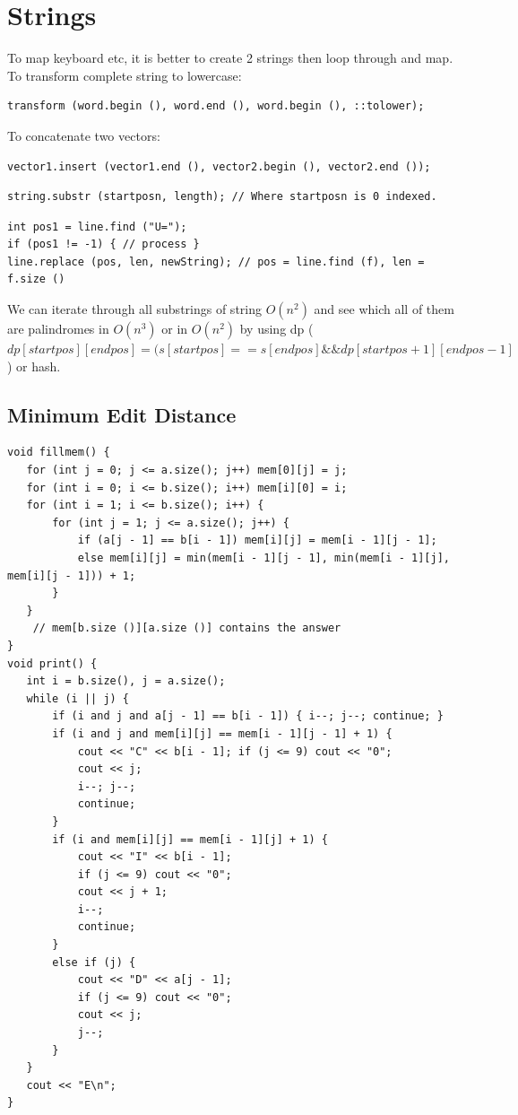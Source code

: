 \documentclass[8pt, a4paper, oneside, twocolumn]{extarticle}
\begin{document}
\section{Strings}
To map keyboard etc, it is better to create 2 strings then loop through and map.\\
To transform complete string to lowercase: 
\begin{verbatim} 
transform (word.begin (), word.end (), word.begin (), ::tolower); 
\end{verbatim}
To concatenate two vectors: 
\begin{verbatim}
vector1.insert (vector1.end (), vector2.begin (), vector2.end ()); 
\end{verbatim}
\begin{verbatim} 
string.substr (startposn, length); // Where startposn is 0 indexed.
\end{verbatim}
\begin{verbatim}
int pos1 = line.find ("U=");
if (pos1 != -1) { // process }  
line.replace (pos, len, newString); // pos = line.find (f), len = f.size ()
\end{verbatim}
We can iterate through all substrings of string $O(n^2)$ and see which all of them are palindromes in $O(n^3)$ or in $O(n^2)$ by using dp ($dp[startpos][endpos] = (s[startpos] == s[endpos] \&\& dp[startpos + 1][endpos - 1]$) or hash.
\subsection{Minimum Edit Distance}
\begin{verbatim}
void fillmem() {
   for (int j = 0; j <= a.size(); j++) mem[0][j] = j;
   for (int i = 0; i <= b.size(); i++) mem[i][0] = i;
   for (int i = 1; i <= b.size(); i++) {
       for (int j = 1; j <= a.size(); j++) {
           if (a[j - 1] == b[i - 1]) mem[i][j] = mem[i - 1][j - 1];
           else mem[i][j] = min(mem[i - 1][j - 1], min(mem[i - 1][j], mem[i][j - 1])) + 1;
       }
   }
    // mem[b.size ()][a.size ()] contains the answer
}
void print() {
   int i = b.size(), j = a.size();
   while (i || j) {
       if (i and j and a[j - 1] == b[i - 1]) { i--; j--; continue; }
       if (i and j and mem[i][j] == mem[i - 1][j - 1] + 1) {
           cout << "C" << b[i - 1]; if (j <= 9) cout << "0";
           cout << j;
           i--; j--;
           continue;
       }
       if (i and mem[i][j] == mem[i - 1][j] + 1) {
           cout << "I" << b[i - 1];
           if (j <= 9) cout << "0";
           cout << j + 1;
           i--;
           continue;
       }
       else if (j) {
           cout << "D" << a[j - 1];
           if (j <= 9) cout << "0";
           cout << j;
           j--;
       }
   }
   cout << "E\n";
}
\end{verbatim}
\end{document}
